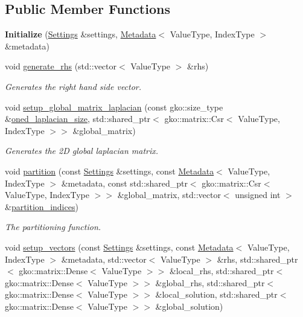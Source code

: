 \subsection*{Public Member Functions}
\begin{DoxyCompactItemize}
\item 
\mbox{\label{classSchwarzWrappers_1_1Initialize_aebea672ffe21a1407bb428422b7c13a4}} 
{\bfseries Initialize} (\hyperlink{structSchwarzWrappers_1_1Settings}{Settings} \&settings, \hyperlink{structSchwarzWrappers_1_1Metadata}{Metadata}$<$ Value\+Type, Index\+Type $>$ \&metadata)
\item 
void \hyperlink{classSchwarzWrappers_1_1Initialize_a96fdb68e6a32c55e411b9a9e11a276f9}{generate\+\_\+rhs} (std\+::vector$<$ Value\+Type $>$ \&rhs)
\begin{DoxyCompactList}\small\item\em Generates the right hand side vector. \end{DoxyCompactList}\item 
void \hyperlink{classSchwarzWrappers_1_1Initialize_abb6b1f844e9f334b2baf07f114506a77}{setup\+\_\+global\+\_\+matrix\+\_\+laplacian} (const gko\+::size\+\_\+type \&\hyperlink{structSchwarzWrappers_1_1Metadata_a273537397c2735f54f4e50701f3e2c1d}{oned\+\_\+laplacian\+\_\+size}, std\+::shared\+\_\+ptr$<$ gko\+::matrix\+::\+Csr$<$ Value\+Type, Index\+Type $>$$>$ \&global\+\_\+matrix)
\begin{DoxyCompactList}\small\item\em Generates the 2D global laplacian matrix. \end{DoxyCompactList}\item 
void \hyperlink{classSchwarzWrappers_1_1Initialize_a2a7a5d4e8ac0312541c3e82ce9d2ae7f}{partition} (const \hyperlink{structSchwarzWrappers_1_1Settings}{Settings} \&settings, const \hyperlink{structSchwarzWrappers_1_1Metadata}{Metadata}$<$ Value\+Type, Index\+Type $>$ \&metadata, const std\+::shared\+\_\+ptr$<$ gko\+::matrix\+::\+Csr$<$ Value\+Type, Index\+Type $>$$>$ \&global\+\_\+matrix, std\+::vector$<$ unsigned int $>$ \&\hyperlink{classSchwarzWrappers_1_1Initialize_a9ad20884882db7c28560d9f9755e571e}{partition\+\_\+indices})
\begin{DoxyCompactList}\small\item\em The partitioning function. \end{DoxyCompactList}\item 
void \hyperlink{classSchwarzWrappers_1_1Initialize_a33d71c2f18d2f23057091e3f95e52532}{setup\+\_\+vectors} (const \hyperlink{structSchwarzWrappers_1_1Settings}{Settings} \&settings, const \hyperlink{structSchwarzWrappers_1_1Metadata}{Metadata}$<$ Value\+Type, Index\+Type $>$ \&metadata, std\+::vector$<$ Value\+Type $>$ \&rhs, std\+::shared\+\_\+ptr$<$ gko\+::matrix\+::\+Dense$<$ Value\+Type $>$$>$ \&local\+\_\+rhs, std\+::shared\+\_\+ptr$<$ gko\+::matrix\+::\+Dense$<$ Value\+Type $>$$>$ \&global\+\_\+rhs, std\+::shared\+\_\+ptr$<$ gko\+::matrix\+::\+Dense$<$ Value\+Type $>$$>$ \&local\+\_\+solution, std\+::shared\+\_\+ptr$<$ gko\+::matrix\+::\+Dense$<$ Value\+Type $>$$>$ \&global\+\_\+solution)

\end{DoxyCompactItemize}

